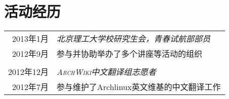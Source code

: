 \documentclass[a4paper,10pt]{article} %
\begin{document}
\section{活动经历}
\begin{tabular}{r|p{11cm}}

\textsc{2013年1月} & \emph{\textsc{北京理工大学校研究生会}，青春试航部部员} \\
\textsc{2012年9月} & \footnotesize{
参与并协助举办了多个讲座等活动的组织
}\\
\multicolumn{2}{c}{} \\
\textsc{2012年12月} & \emph{\textsc{ArchWiki中文翻译组}志愿者}\\
\textsc{2012年7月} & \footnotesize{参与维护了Archlinux英文维基的中文翻译工作}

\end{tabular}



\end{document}

